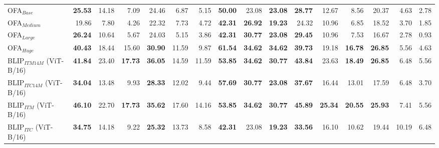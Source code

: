 \begin{table}[ht]
\begin{adjustbox}{max width=\textwidth}
\begin{tabular}{l|rrr|rrr|rrr|rrr|rrr}
 OFA$_{Base}$                        & \textbf{25.53} & 14.18          & 7.09           & 24.46          & 6.87           & 5.15           & \textbf{50.00} & 23.08          & \textbf{23.08} & \textbf{28.77} & 12.67          & 8.56           & 20.37          & 4.63           & 2.78           \\
 OFA$_{Medium}$                      & 19.86          & 7.80           & 4.26           & 22.32          & 7.73           & 4.72           & \textbf{42.31} & \textbf{26.92} & \textbf{19.23} & 24.32          & 10.96          & 6.85           & 18.52          & 3.70           & 1.85           \\
 OFA$_{Large}$                       & \textbf{26.24} & 10.64          & 5.67           & 24.03          & 5.15           & 3.86           & \textbf{42.31} & \textbf{30.77} & \textbf{23.08} & \textbf{29.45} & 10.96          & 7.53           & 16.67          & 2.78           & 0.93           \\
 OFA$_{Huge}$                        & \textbf{40.43} & 18.44          & 15.60          & \textbf{30.90} & 11.59          & 9.87           & \textbf{61.54} & \textbf{34.62} & \textbf{34.62} & \textbf{39.73} & 19.18          & \textbf{16.78} & \textbf{26.85} & 5.56           & 4.63           \\
 BLIP$_{ITM 14M}$ (ViT-B/16)         & \textbf{41.84} & 23.40          & \textbf{17.73} & \textbf{36.05} & 14.59          & 11.59          & \textbf{53.85} & \textbf{34.62} & \textbf{30.77} & \textbf{43.84} & 23.63          & \textbf{18.49} & \textbf{26.85} & 6.48           & 5.56           \\
 BLIP$_{ITC 14M}$ (ViT-B/16)         & \textbf{34.04} & 13.48          & 9.93           & \textbf{28.33} & 12.02          & 9.44           & \textbf{57.69} & \textbf{30.77} & \textbf{23.08} & \textbf{37.67} & 16.44          & 13.01          & 17.59          & 6.48           & 3.70           \\
 BLIP$_{ITM}$ (ViT-B/16)             & \textbf{46.10} & 22.70          & \textbf{17.73} & \textbf{35.62} & 17.60          & 14.16          & \textbf{53.85} & \textbf{34.62} & \textbf{30.77} & \textbf{45.89} & \textbf{25.34} & \textbf{20.55} & \textbf{25.93} & 7.41           & 5.56           \\
 BLIP$_{ITC}$ (ViT-B/16)             & \textbf{34.75} & 14.18          & 9.22           & \textbf{25.32} & 13.73          & 8.58           & \textbf{42.31} & 23.08          & \textbf{19.23} & \textbf{33.56} & 16.10          & 10.62          & 19.44          & 10.19          & 6.48           \\

\end{tabular}
\end{adjustbox}
\end{table}
